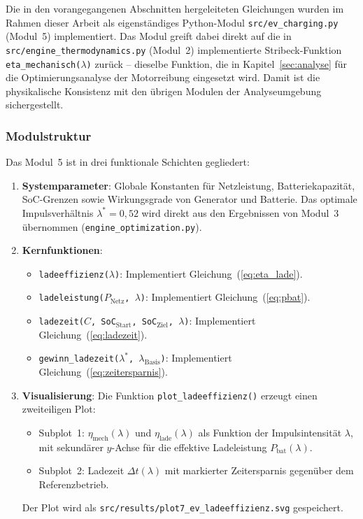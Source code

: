 ﻿\documentclass[a4paper,12pt]{article}
\begin{document}
Die in den vorangegangenen Abschnitten hergeleiteten Gleichungen wurden
im Rahmen dieser Arbeit als eigenständiges Python-Modul \texttt{src/ev\_charging.py}
(Modul~5) implementiert. Das Modul greift dabei direkt auf die in
\texttt{src/engine\_thermodynamics.py} (Modul~2) implementierte Stribeck-Funktion
\texttt{eta\_mechanisch($\lambda$)} zurück -- dieselbe Funktion, die in
Kapitel~\ref{sec:analyse} für die Optimierungsanalyse der Motorreibung
eingesetzt wird. Damit ist die physikalische Konsistenz mit den übrigen
Modulen der Analyseumgebung sichergestellt.

\subsubsection{Modulstruktur}

Das Modul~5 ist in drei funktionale Schichten gegliedert:

\begin{enumerate}
  \item \textbf{Systemparameter}: Globale Konstanten für Netzleistung,
    Batteriekapazität, SoC-Grenzen sowie Wirkungsgrade von Generator und
    Batterie. Das optimale Impulsverhältnis $\lambda^* = 0{,}52$ wird direkt
    aus den Ergebnissen von Modul~3 übernommen (\texttt{engine\_optimization.py}).

  \item \textbf{Kernfunktionen}:
    \begin{itemize}
      \item \texttt{ladeeffizienz($\lambda$)}: Implementiert
        Gleichung~(\ref{eq:eta_lade}).
      \item \texttt{ladeleistung($P_\text{Netz}$, $\lambda$)}: Implementiert
        Gleichung~(\ref{eq:pbat}).
      \item \texttt{ladezeit($C$, SoC$_\text{Start}$, SoC$_\text{Ziel}$, $\lambda$)}:
        Implementiert Gleichung~(\ref{eq:ladezeit}).
      \item \texttt{gewinn\_ladezeit($\lambda^*$, $\lambda_\text{Basis}$)}:
        Implementiert Gleichung~(\ref{eq:zeitersparnis}).
    \end{itemize}

  \item \textbf{Visualisierung}: Die Funktion \texttt{plot\_ladeeffizienz()}
    erzeugt einen zweiteiligen Plot:
    \begin{itemize}
      \item Subplot~1: $\eta_\text{mech}(\lambda)$ und $\eta_\text{lade}(\lambda)$
        als Funktion der Impulsintensität $\lambda$, mit sekundärer $y$-Achse
        für die effektive Ladeleistung $P_\text{bat}(\lambda)$.
      \item Subplot~2: Ladezeit $\Delta t(\lambda)$ mit markierter Zeitersparnis
        gegenüber dem Referenzbetrieb.
    \end{itemize}
    Der Plot wird als \texttt{src/results/plot7\_ev\_ladeeffizienz.svg}
    gespeichert.
\end{enumerate}
\end{document}

